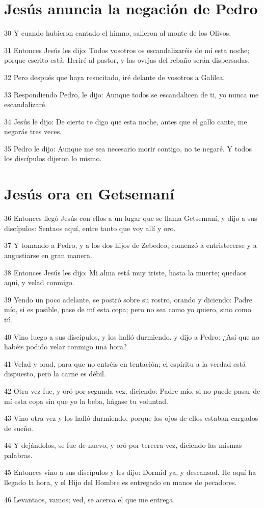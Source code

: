 \section*{Jesús anuncia la negación de Pedro}

\par 30 Y cuando hubieron cantado el himno, salieron al monte de los Olivos.
\par 31 Entonces Jesús les dijo: Todos vosotros os escandalizaréis de mí esta noche; porque escrito está: Heriré al pastor, y las ovejas del rebaño serán dispersadas.
\par 32 Pero después que haya resucitado, iré delante de vosotros a Galilea.
\par 33 Respondiendo Pedro, le dijo: Aunque todos se escandalicen de ti, yo nunca me escandalizaré.
\par 34 Jesús le dijo: De cierto te digo que esta noche, antes que el gallo cante, me negarás tres veces.
\par 35 Pedro le dijo: Aunque me sea necesario morir contigo, no te negaré. Y todos los discípulos dijeron lo mismo.

\section*{Jesús ora en Getsemaní}

\par 36 Entonces llegó Jesús con ellos a un lugar que se llama Getsemaní, y dijo a sus discípulos: Sentaos aquí, entre tanto que voy allí y oro.
\par 37 Y tomando a Pedro, y a los dos hijos de Zebedeo, comenzó a entristecerse y a angustiarse en gran manera.
\par 38 Entonces Jesús les dijo: Mi alma está muy triste, hasta la muerte; quedaos aquí, y velad conmigo.
\par 39 Yendo un poco adelante, se postró sobre su rostro, orando y diciendo: Padre mío, si es posible, pase de mí esta copa; pero no sea como yo quiero, sino como tú.
\par 40 Vino luego a sus discípulos, y los halló durmiendo, y dijo a Pedro: ¿Así que no habéis podido velar conmigo una hora?
\par 41 Velad y orad, para que no entréis en tentación; el espíritu a la verdad está dispuesto, pero la carne es débil.
\par 42 Otra vez fue, y oró por segunda vez, diciendo: Padre mío, si no puede pasar de mí esta copa sin que yo la beba, hágase tu voluntad.
\par 43 Vino otra vez y los halló durmiendo, porque los ojos de ellos estaban cargados de sueño.
\par 44 Y dejándolos, se fue de nuevo, y oró por tercera vez, diciendo las mismas palabras.
\par 45 Entonces vino a sus discípulos y les dijo: Dormid ya, y descansad. He aquí ha llegado la hora, y el Hijo del Hombre es entregado en manos de pecadores.
\par 46 Levantaos, vamos; ved, se acerca el que me entrega.


